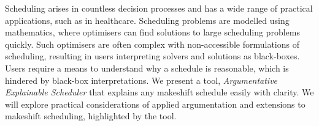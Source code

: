 Scheduling arises in countless decision processes and has a wide range of practical applications, such as in healthcare. Scheduling problems are modelled using mathematics, where optimisers can find solutions to large scheduling problems quickly. Such optimisers are often complex with non-accessible formulations of scheduling, resulting in users interpreting solvers and solutions as black-boxes. Users require a means to understand why a schedule is reasonable, which is hindered by black-box interpretations.
\linespace
We present a tool, \emph{Argumentative Explainable Scheduler} that explains any makeshift schedule easily with clarity. We will explore practical considerations of applied argumentation and extensions to makeshift scheduling, highlighted by the tool.